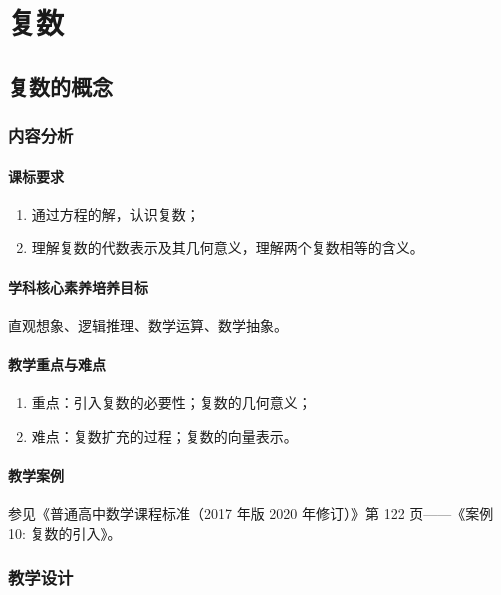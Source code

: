 \chapter{复数}
\newpage
\section{复数的概念}
\subsection{内容分析}
\subsubsection{课标要求}
\begin{enumerate}
    \item 通过方程的解，认识复数；
    \item 理解复数的代数表示及其几何意义，理解两个复数相等的含义。
\end{enumerate}

\subsubsection{学科核心素养培养目标}
直观想象、逻辑推理、数学运算、数学抽象。

\subsubsection{教学重点与难点}
\begin{enumerate}
    \item 重点：引入复数的必要性；复数的几何意义；
    \item 难点：复数扩充的过程；复数的向量表示。
\end{enumerate}

\subsubsection{教学案例}
参见《普通高中数学课程标准（2017 年版 2020 年修订）》第 122 页——《案例 10: 复数的引入》。


\subsection{教学设计}
